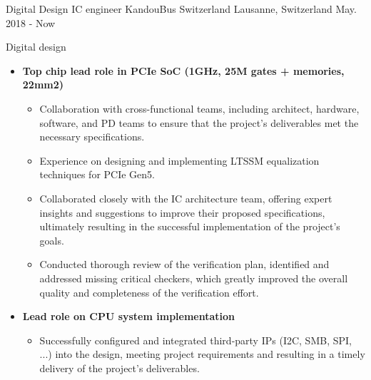 

\begin{cventries}

  \cventry
    {Digital Design IC engineer} %
    {KandouBus Switzerland} %
    {Lausanne, Switzerland} %
    {May. 2018 - Now} %
    {
      \begin{cvitems} %
        \item {Digital design}
        \begin{itemize}
          \item {\textbf{Top chip lead role in PCIe SoC (1GHz, 25M gates + memories, 22mm2)}}
          \begin{itemize}
            \item {Collaboration with cross-functional teams, including architect, hardware, software, and PD teams to ensure that the project's deliverables met the necessary specifications.}
            \item {Experience on designing and implementing LTSSM equalization techniques for PCIe Gen5.}
            \item {Collaborated closely with the IC architecture team, offering expert insights and suggestions to improve their proposed specifications, ultimately resulting in the successful implementation of the project's goals.}
            \item {Conducted thorough review of the verification plan, identified and addressed missing critical checkers, which greatly improved the overall quality and completeness of the verification effort.}
          \end{itemize}
          \item {\textbf{Lead role on CPU system implementation}}
          \begin{itemize}
            \item {Successfully configured and integrated third-party IPs (I2C, SMB, SPI, ...) into the design, meeting project requirements and resulting in a timely delivery of the project's deliverables.}

\end{itemize}
\end{itemize}
\end{cvitems}}
\end{cventries}
